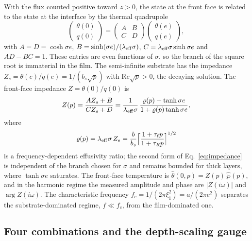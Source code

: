 With the flux counted positive toward $z>0$, the state at the front face is related to the state at the
interface by the thermal quadrupole~~\cite{Krapez2019}
\begin{equation}
\begin{pmatrix}\theta(0)\\ q(0)\end{pmatrix}=
\begin{pmatrix}A&B\\ C&D\end{pmatrix}
\begin{pmatrix}\theta(e)\\ q(e)\end{pmatrix},
\label{eq:quadrupole}
\end{equation}
with $A=D=\cosh\sigma e$, $B=\sinh(\sigma e)/(\lambda_{\rm eff}\sigma)$,
$C=\lambda_{\rm eff}\sigma\sinh\sigma e$ and $AD-BC=1$. These entries are even functions of $\sigma$,
so the branch of the square root is immaterial in the film. The semi-infinite substrate has the
impedance $Z_s=\theta(e)/q(e)=1/(b_s\sqrt p)$ with $\mathrm{Re}\sqrt p>0$, the decaying solution. The
front-face impedance $Z=\theta(0)/q(0)$ is
\begin{equation}
Z(p)=\frac{AZ_s+B}{CZ_s+D}=\frac{1}{\lambda_{\rm eff}\sigma}\,
\frac{\varrho(p)+\tanh\sigma e}{1+\varrho(p)\tanh\sigma e},
\label{eq:impedance}
\end{equation}
where
\begin{equation}
\varrho(p)=\lambda_{\rm eff}\sigma\,Z_s=\frac{b}{b_s}\Big[\frac{1+\tau_\ell p}{1+\tau_Rp}\Big]^{1/2}
\label{eq:rho}
\end{equation}
is a frequency-dependent effusivity ratio; the second form of Eq.~\eqref{eq:impedance} is independent of
the branch chosen for $\sigma$ and remains bounded for thick layers, where $\tanh\sigma e$ saturates.
The front-face temperature is $\hat\theta(0,p)=Z(p)\,\hat\wp(p)$, and in the harmonic regime the
measured amplitude and phase are $|Z(i\omega)|$ and $\arg Z(i\omega)$. The characteristic frequency
$f_c=1/(2\pi\xi_1^2)=a/(2\pi e^2)$ separates the substrate-dominated regime, $f\ll f_c$, from the
film-dominated one.

\subsection{Four combinations and the depth-scaling gauge}\label{sec:gauge}

